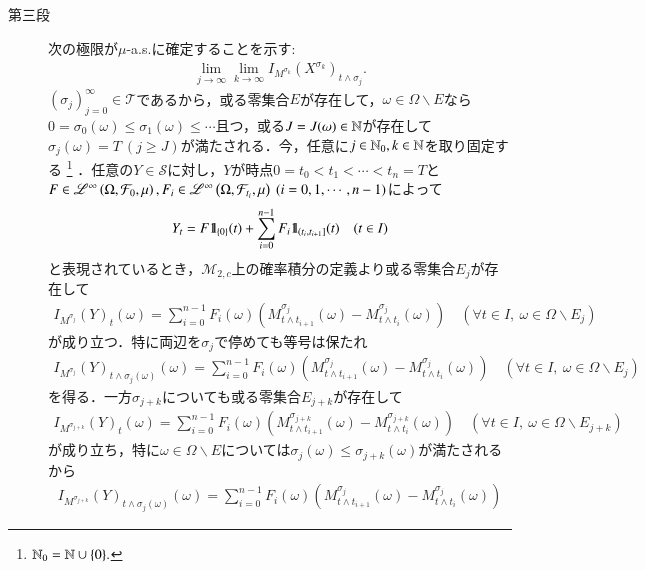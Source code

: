 \begin{prf}
\begin{description}
			\item[第三段]
				次の極限が$\mu$-a.s.に確定することを示す:
				\begin{align}
					\lim_{j \to \infty} \lim_{k \to \infty} I_{M^{\sigma_k}}(X^{\sigma_k})_{t \wedge \sigma_j}.
				\end{align}
				$(\sigma_j)_{j=0}^{\infty} \in \mathcal{T}$であるから，或る零集合$E$が存在して，$\omega \in \Omega \backslash E$なら
				$0 = \sigma_0(\omega) \leq \sigma_1(\omega) \leq \cdots$且つ，或る$J = J(\omega) \in \mathbb{N}$が存在して
				$\sigma_j(\omega) = T\ (j \geq J)$が満たされる．今，任意に$j \in \mathbb{N}_0,k \in \mathbb{N}$を取り固定する
				\footnote{
					$\mathbb{N}_0 = \mathbb{N} \cup \{0\}.$
				}
				．任意の$Y \in \mathcal{S}$に対し，$Y$が時点$0=t_0 < t_1 < \cdots < t_n = T$と
				$F \in \semiLp{\infty}{\Omega,\mathcal{F}_0,\mu},F_i \in \semiLp{\infty}{\Omega,\mathcal{F}_{t_i},\mu}\ (i=0,1,\cdots,n-1)$によって
				\begin{align}
					Y_t = F \mbox{1}\hspace{-0.25em}\mbox{l}_{\{0\}}(t) + \sum_{i=0}^{n-1} F_i \mbox{1}\hspace{-0.25em}\mbox{l}_{\left(t_i,t_{i+1}\right]}(t)
					\quad (t \in I)
				\end{align}
				と表現されているとき，$\mathcal{M}_{2,c}$上の確率積分の定義より或る零集合$E_j$が存在して
				\begin{align}
					I_{M^{\sigma_j}}(Y)_t(\omega) = \sum_{i=0}^{n-1} F_i(\omega) \left( M^{\sigma_j}_{t \wedge t_{i+1}}(\omega) - M^{\sigma_j}_{t \wedge t_i}(\omega) \right)
					\quad (\forall t \in I,\ \omega \in \Omega \backslash E_j)
				\end{align}
				が成り立つ．特に両辺を$\sigma_j$で停めても等号は保たれ
				\begin{align}
					I_{M^{\sigma_j}}(Y)_{t \wedge \sigma_j(\omega)}(\omega) = \sum_{i=0}^{n-1} F_i(\omega) \left( M^{\sigma_j}_{t \wedge t_{i+1}}(\omega) - M^{\sigma_j}_{t \wedge t_i}(\omega) \right)
					\quad (\forall t \in I,\ \omega \in \Omega \backslash E_j)
				\end{align}
				を得る．一方$\sigma_{j+k}$についても或る零集合$E_{j+k}$が存在して
				\begin{align}
					I_{M^{\sigma_{j+k}}}(Y)_t(\omega) = \sum_{i=0}^{n-1} F_i(\omega) \left( M^{\sigma_{j+k}}_{t \wedge t_{i+1}}(\omega) - M^{\sigma_{j+k}}_{t \wedge t_i}(\omega) \right)
					\quad (\forall t \in I,\ \omega \in \Omega \backslash E_{j+k})
				\end{align}
				が成り立ち，特に$\omega \in \Omega \backslash E$については$\sigma_j(\omega) \leq \sigma_{j+k}(\omega)$が満たされるから
				\begin{align}
					I_{M^{\sigma_{j+k}}}(Y)_{t \wedge \sigma_j(\omega)}(\omega) = \sum_{i=0}^{n-1} F_i(\omega) \left( M^{\sigma_j}_{t \wedge t_{i+1}}(\omega) - M^{\sigma_j}_{t \wedge t_i}(\omega) \right)

\end{align}
\end{description}
\end{prf}

